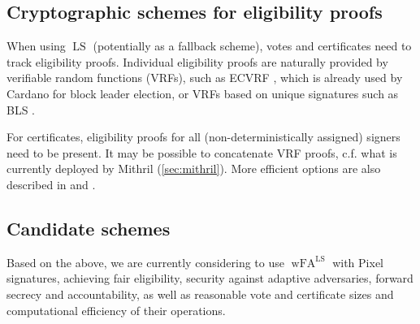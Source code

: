 \subsection{Cryptographic schemes for eligibility proofs}\label{sec:eligibility proofs}

When using $\operatorname{LS}$ (potentially as a fallback scheme), votes and certificates need to track eligibility proofs.
Individual eligibility proofs are naturally provided by verifiable random functions (VRFs), such as ECVRF \parencite{goldberg2023vrf_rfc9381}, which is already used by Cardano for block leader election, or VRFs based on unique signatures such as BLS \parencite{boneh2004short}.

For certificates, eligibility proofs for all (non-deterministically assigned) signers need to be present.
It may be possible to concatenate VRF proofs, c.f. what is currently deployed by Mithril (\cref{sec:mithril}).
More efficient options are also described in \cite[Section 5.3]{chaidos2024mithril} and \cite{fleischhacker2024jackpot}.

\subsection{Candidate schemes}

Based on the above, we are currently considering to use $\operatorname{wFA}^{\operatorname{LS}}$ with Pixel signatures, achieving fair eligibility, security against adaptive adversaries, forward secrecy and accountability, as well as reasonable vote and certificate sizes and computational efficiency of their operations.

